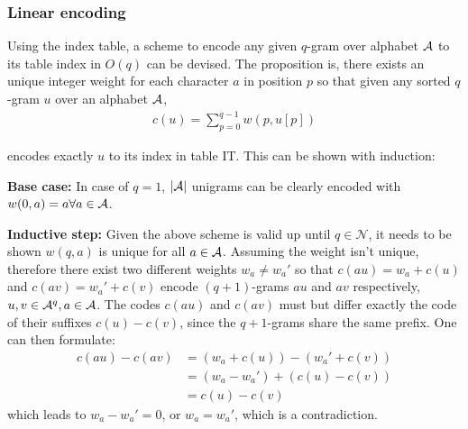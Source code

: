 \subsubsection{Linear encoding}

Using the index table, a scheme to encode any given \(q\)-gram over alphabet \(\mathcal{A}\) to its table index in \(O(q)\) can be devised. The proposition is, there exists an unique integer weight for each character \(a\) in position \(p\) so that given any sorted \(q\)-gram \(u\) over an alphabet \(\mathcal{A}\),
\begin{align}
    c(u)=\sum_{p=0}^{q-1} w(p,u[p])\label{Equation:linearenc}
\end{align} 

encodes exactly \(u\) to its index in table IT. This can be shown with induction:

\textbf{Base case:} In case of \(q=1\), \(|\mathcal{A}|\) unigrams can be clearly encoded with \(w(0,a) = a \forall a \in \mathcal{A}\).

\textbf{Inductive step:} Given the above scheme is valid up until \(q\in \mathcal{N}\), it needs to be shown \(w(q,a)\) is unique for all \(a\in \mathcal{A}\). Assuming the weight isn't unique, therefore there exist two different weights \(w_a\neq w_a'\) so that \(c(au) = w_a + c(u)\) and \(c(av) = w_a' + c(v)\) encode \((q+1)\)-grams \(au\) and \(av\) respectively, \(u,v\in \mathcal{A}^q,a\in\mathcal{A}\). The codes \(c(au)\) and \(c(av)\) must but differ exactly the code of their suffixes \(c(u)-c(v)\), since the \(q+1\)-grams share the same prefix. One can then formulate:
\begin{align}
    c(au) - c(av) &= (w_a + c(u)) - (w_a' + c(v))\\
    &= (w_a - w_a') + (c(u) - c(v))\\
    &= c(u) - c(v)
\end{align}
which leads to \(w_a - w_a' = 0\), or \(w_a = w_a'\), which is a contradiction.

